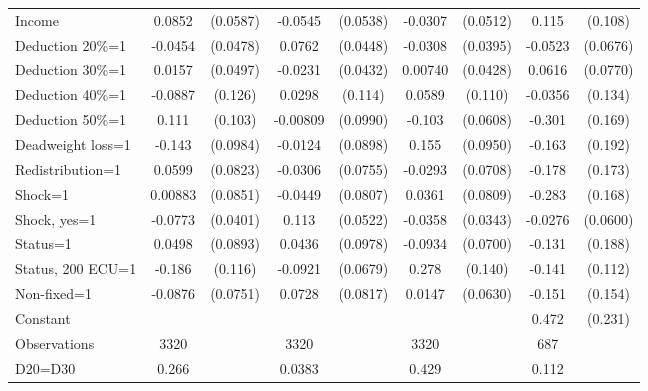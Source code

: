 \begin{tabular}{l|cccccc|cc}
Income          &   0.0852         & (0.0587)&  -0.0545         & (0.0538)&  -0.0307         & (0.0512)&    0.115         &  (0.108)\\
Deduction 20\%=1&  -0.0454         & (0.0478)&   0.0762\sym{*}  & (0.0448)&  -0.0308         & (0.0395)&  -0.0523         & (0.0676)\\
Deduction 30\%=1&   0.0157         & (0.0497)&  -0.0231         & (0.0432)&  0.00740         & (0.0428)&   0.0616         & (0.0770)\\
Deduction 40\%=1&  -0.0887         &  (0.126)&   0.0298         &  (0.114)&   0.0589         &  (0.110)&  -0.0356         &  (0.134)\\
Deduction 50\%=1&    0.111         &  (0.103)& -0.00809         & (0.0990)&   -0.103\sym{*}  & (0.0608)&   -0.301\sym{*}  &  (0.169)\\
Deadweight loss=1&   -0.143         & (0.0984)&  -0.0124         & (0.0898)&    0.155         & (0.0950)&   -0.163         &  (0.192)\\
Redistribution=1&   0.0599         & (0.0823)&  -0.0306         & (0.0755)&  -0.0293         & (0.0708)&   -0.178         &  (0.173)\\
Shock=1         &  0.00883         & (0.0851)&  -0.0449         & (0.0807)&   0.0361         & (0.0809)&   -0.283\sym{*}  &  (0.168)\\
Shock, yes=1    &  -0.0773\sym{*}  & (0.0401)&    0.113\sym{**} & (0.0522)&  -0.0358         & (0.0343)&  -0.0276         & (0.0600)\\
Status=1        &   0.0498         & (0.0893)&   0.0436         & (0.0978)&  -0.0934         & (0.0700)&   -0.131         &  (0.188)\\
Status, 200 ECU=1&   -0.186         &  (0.116)&  -0.0921         & (0.0679)&    0.278\sym{**} &  (0.140)&   -0.141         &  (0.112)\\
Non-fixed=1     &  -0.0876         & (0.0751)&   0.0728         & (0.0817)&   0.0147         & (0.0630)&   -0.151         &  (0.154)\\
Constant        &                  &         &                  &         &                  &         &    0.472\sym{**} &  (0.231)\\
\hline
Observations    &     3320         &         &     3320         &         &     3320         &         &      687         &         \\
D20=D30         &    0.266         &         &   0.0383         &         &    0.429         &         &    0.112         &         \\

\end{tabular}

